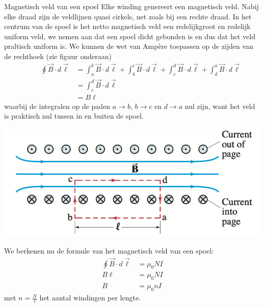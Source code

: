 \begin{theo}{Magnetisch veld van een spoel}
    \noindent Elke winding genereert een magnetisch veld. Nabij elke draad zijn de veldlijnen quasi cirkels, net zoals bij een rechte draad. 
    In het centrum van de spoel is het netto magnetisch veld een redelijkgroot en redelijk uniform veld, we nemen aan dat een spoel dicht gebonden is en dus dat het veld praltisch uniform is.
    We kunnen de wet van Ampère toepassen op de zijden van de rechthoek (zie figuur onderaan)
    \begin{align*}
       \hspace{1cm}
        \oint \Vec{B} \cdot d\Vec{\ell} &= \int_{a}^{b} \Vec{B} \cdot d\Vec{\ell} + \int_{b}^{c} \Vec{B} \cdot d\Vec{\ell}
        +  \int_{c}^{d} \Vec{B} \cdot d\Vec{\ell} +  \int_{d}^{a} \Vec{B} \cdot d\Vec{\ell} \\
                                        &= \int_{c}^{d} \Vec{B} \cdot d\Vec{\ell}  \\
                                        &= B\ell
    \end{align*}
    waarbij de integralen op de paden $a \to b$, $b \to c$ en $d \to a$ nul zijn, want het veld is praktisch nul tussen in en buiten de spoel.

    \begin{center}
        \hspace*{1cm}\includegraphics[scale = 0.3]{Images/Magnetisme/SpoelMagnetischVeld}
    \end{center}

    We berkenen nu de formule van het magnetisch veld van een spoel:
    \begin{align*}
        \oint \Vec{B} \cdot d\Vec{\ell} &= \mu_{0}NI \\
        B\ell &=  \mu_{0}NI \\
        B &=  \mu_{0}nI
    \end{align*}
    met $n= \tfrac{N}{\ell}$ het aantal windingen per lengte.
\end{theo}

